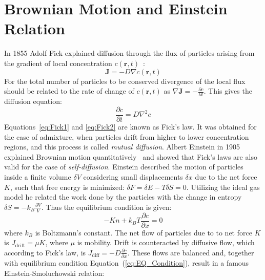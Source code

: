 \section{Brownian Motion and Einstein Relation}
In 1855 Adolf Fick explained diffusion through the flux of particles arising from the gradient of local concentration $c(\mathbf{r},t)$~\cite{Fick}:
\begin{equation}\label{eq:Fick1}
\mathbf{J}=-D\nabla c(\mathbf{r},t)
\end{equation}
For the total number of particles to be conserved divergence of the local flux should be related to the rate of change of $c(\mathbf{r},t)$ as $\nabla\mathbf{J}=-\frac{\partial c}{\partial t}$. This gives the diffusion equation:
\begin{equation}\label{eq:Fick2}
\frac{\partial c}{\partial t}=D\nabla^2c
\end{equation}
Equations~\ref{eq:Fick1} and \ref{eq:Fick2} are known as Fick's law. 
It was obtained for the case of admixture, when particles drift from higher to lower concentration regions, and this process is called \textit{mutual diffusion}. 
Albert Einstein in 1905 explained Brownian motion quantitatively~\cite{Einstein} and showed that Fick's laws are also valid for the case of \textit{self-diffusion}. 
Einstein described the motion of particles inside a finite volume $\delta V$ considering small displacements $\delta x$ due to the net force $K$, such that free energy is minimized: $\delta F=\delta E - T\delta S=0$. 
Utilizing the ideal gas model he related the work done by the particles with the change in entropy $\delta S = -k_B\frac{\partial V}{V}$. Thus the equilibrium condition is given:
\begin{equation}\label{eq:EQ_Condition}
-Kn+k_BT\frac{\partial c}{\partial x}=0
\end{equation}
where $k_B$ is Boltzmann's constant. The net flow of particles due to to net force $K$ is $J_{\mathrm{drift}}=\mu K $, where $\mu$ is mobility. Drift is counteracted by diffusive flow,  which according to Fick's law, is $J_{\mathrm{diff}}=-D\frac{\partial c}{\partial x}$. 
These flows are balanced and, together with equilibrium condition Equation~(\ref{eq:EQ_Condition}), result in a famous Einstein-Smoluchowski relation:
